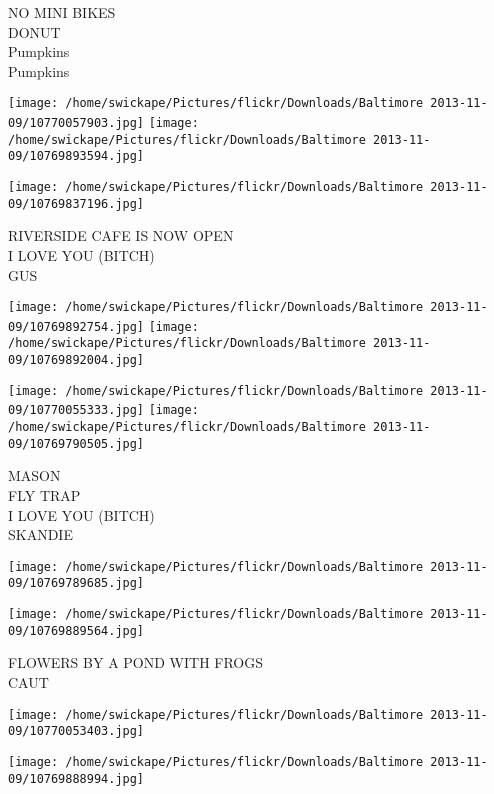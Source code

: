 \documentclass[10pt,letterpaper]{article}
\begin{document}
NO MINI BIKES\\
DONUT\\
Pumpkins\\
Pumpkins\\
\pagebreak

\texttt{[image: /home/swickape/Pictures/flickr/Downloads/Baltimore 2013-11-09/10770057903.jpg]}
\texttt{[image: /home/swickape/Pictures/flickr/Downloads/Baltimore 2013-11-09/10769893594.jpg]}

\vspace{0.25in}
\texttt{[image: /home/swickape/Pictures/flickr/Downloads/Baltimore 2013-11-09/10769837196.jpg]}

RIVERSIDE CAFE IS NOW OPEN\\
I LOVE YOU (BITCH)\\
GUS\\
\pagebreak

\texttt{[image: /home/swickape/Pictures/flickr/Downloads/Baltimore 2013-11-09/10769892754.jpg]}
\texttt{[image: /home/swickape/Pictures/flickr/Downloads/Baltimore 2013-11-09/10769892004.jpg]}

\texttt{[image: /home/swickape/Pictures/flickr/Downloads/Baltimore 2013-11-09/10770055333.jpg]}
\texttt{[image: /home/swickape/Pictures/flickr/Downloads/Baltimore 2013-11-09/10769790505.jpg]}

MASON\\
FLY TRAP\\
I LOVE YOU (BITCH)\\
SKANDIE\\
\pagebreak

\texttt{[image: /home/swickape/Pictures/flickr/Downloads/Baltimore 2013-11-09/10769789685.jpg]}

\vspace{0.25in}
\texttt{[image: /home/swickape/Pictures/flickr/Downloads/Baltimore 2013-11-09/10769889564.jpg]}

FLOWERS BY A POND WITH FROGS\\
CAUT\\
\pagebreak

\texttt{[image: /home/swickape/Pictures/flickr/Downloads/Baltimore 2013-11-09/10770053403.jpg]}

\vspace{0.25in}
\texttt{[image: /home/swickape/Pictures/flickr/Downloads/Baltimore 2013-11-09/10769888994.jpg]}
\end{document}
